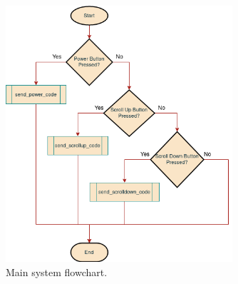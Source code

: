 \documentclass[12pt, letterpaper]{report}
\begin{document}
\begin{figure}[ht]
	\centering
	\includegraphics[width=0.75\textwidth]{Flowchart}
	\caption{Main system flowchart.}
	\label{fig:Flowchart}
\end{figure}



\end{document}
